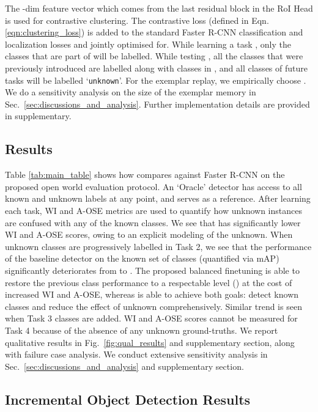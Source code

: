 \documentclass[final]{cvpr}
\newcommand{\cls}[1]{{\small\texttt{#1}}}
\begin{document}
The -dim feature vector which comes from the last residual block in the RoI Head is used for contrastive clustering. The contrastive loss (defined in Eqn. \ref{eqn:clustering_loss}) is added to the standard Faster R-CNN classification and localization losses and jointly optimised for. While learning a task , only the classes that are part of  will be labelled. While testing , all the classes that were previously introduced are labelled along with classes in , and  all classes of future tasks will be labelled `\cls{unknown}'. For the exemplar replay, we empirically choose . We do a sensitivity analysis on the size of the exemplar memory in Sec.~\ref{sec:discussions_and_analysis}. Further implementation details are provided in supplementary.


\subsection{\OWOD Results}\label{sec:main_results}

Table \ref{tab:main_table} shows how \method compares against Faster R-CNN on the proposed open world evaluation protocol.
An `Oracle' detector has access to all known and unknown labels at any point, and serves as a reference. 
After learning each task, WI and A-OSE metrics are used to quantify how unknown instances are confused with any of the known classes. We see that \method has significantly lower WI and A-OSE scores, owing to an explicit modeling of the unknown.
When unknown classes are progressively labelled in Task 2, we see that the performance of the baseline detector on the known set of classes (quantified via mAP) significantly deteriorates from  to . The proposed balanced finetuning is able to restore the previous class performance to a respectable level () at the cost of increased WI and A-OSE, whereas \method is able to achieve both goals: detect known classes and reduce the effect of unknown comprehensively. Similar trend is seen when Task 3 classes are added. WI and A-OSE scores cannot be measured for Task 4 because of the absence of any unknown ground-truths. We report qualitative results in Fig.~\ref{fig:qual_results} and supplementary section, along with failure case analysis. 
We conduct extensive sensitivity analysis in Sec.~\ref{sec:discussions_and_analysis} and supplementary section.


\subsection{Incremental Object Detection Results}\label{sec:incr_OD_results}
\end{document}
